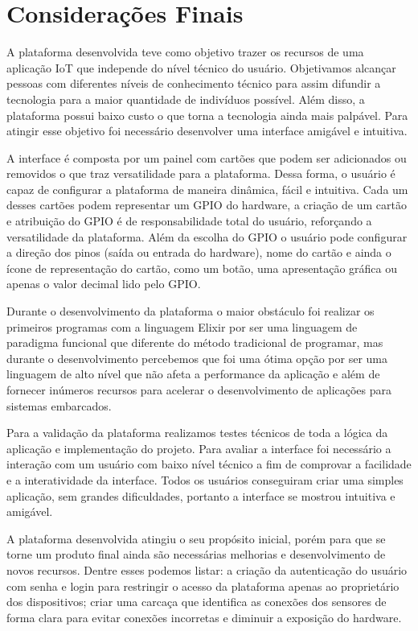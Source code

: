 \documentclass[../../layout.tex]{subfiles}
\begin{document}
\chapter{Considerações Finais}
\hspace*{3em}A plataforma desenvolvida teve como objetivo trazer os recursos de uma aplicação IoT que independe do nível técnico do usuário. Objetivamos alcançar pessoas com diferentes níveis de conhecimento técnico para assim difundir a tecnologia para a maior quantidade de indivíduos possível. Além disso, a plataforma possui baixo custo o que torna a tecnologia ainda mais palpável. Para atingir esse objetivo foi necessário desenvolver uma interface amigável e intuitiva.\par
A interface é composta por um painel com cartões que podem ser adicionados ou removidos o que traz versatilidade para a plataforma. Dessa forma, o usuário é capaz de configurar a plataforma de maneira dinâmica, fácil e intuitiva. Cada um desses cartões podem representar um GPIO do hardware, a criação de um cartão e atribuição do GPIO é de responsabilidade total do usuário, reforçando a versatilidade da plataforma. Além da escolha do GPIO o usuário pode configurar a direção dos pinos (saída ou entrada do hardware), nome do cartão e ainda o ícone de representação do cartão, como um botão, uma apresentação gráfica ou apenas o valor decimal lido pelo GPIO.\par
Durante o desenvolvimento da plataforma o maior obstáculo foi  realizar os primeiros programas com a linguagem Elixir por ser uma linguagem de paradigma funcional que diferente do método tradicional de programar, mas durante o desenvolvimento percebemos que foi uma ótima opção por ser uma linguagem de alto nível que não afeta a performance da aplicação e além de fornecer inúmeros recursos para acelerar o desenvolvimento de aplicações para sistemas embarcados.\par
Para a validação da plataforma realizamos testes técnicos de toda a lógica da aplicação e implementação do projeto. Para avaliar a interface foi necessário a interação com um usuário com baixo nível técnico a fim de comprovar a facilidade e a interatividade da interface. Todos os usuários conseguiram criar uma simples aplicação, sem grandes dificuldades, portanto a interface se mostrou  intuitiva e amigável.\par
A plataforma desenvolvida atingiu o seu propósito inicial, porém para que se torne um produto final ainda são necessárias melhorias e desenvolvimento de novos recursos. Dentre esses podemos listar: a criação da autenticação do usuário com senha e login para restringir o acesso da plataforma apenas ao proprietário dos dispositivos; criar uma carcaça que identifica as conexões dos sensores de forma clara para evitar conexões incorretas e diminuir a exposição do hardware.\par
\end{document}
